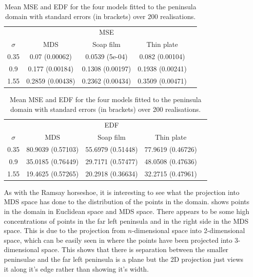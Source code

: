 \begin{table}[ht]
\centering
\begin{tabular}{c c c c c}
 &  & MSE  & &\\ 
$\sigma$ & MDS & Soap film & Thin plate\\ 
\hline
0.35  & 0.07 (0.00062) & 0.0539 (5e-04) &0.082 (0.00104)\\
0.9  & 0.177 (0.00184) & 0.1308 (0.00197) &0.1938 (0.00241)\\
1.55  & 0.2859 (0.00438) & 0.2362 (0.00434) &0.3509 (0.00471)\\
\end{tabular}
\begin{tabular}{c c c c c}
 &  & EDF  & &\\ 
$\sigma$ & MDS & Soap film & Thin plate\\ 
\hline
0.35 &80.9039 (0.57103) & 55.6979 (0.51448) & 77.9619 (0.46726)\\ 
0.9 &35.0185 (0.76449) & 29.7171 (0.57477) & 48.0508 (0.47636)\\ 
1.55 &19.4625 (0.57265) & 20.2918 (0.36634) & 32.2715 (0.47961)\\ 
\end{tabular}
\caption{Mean MSE and EDF for the four models fitted to the peninsula domain with standard errors (in brackets) over 200 realisations.}
\label{wt2resultstable}
\end{table}

As with the Ramsay horseshoe, it is interesting to see what the projection into MDS space has done to the distribution of the points in the domain.  shows points in the domain in Euclidean space and MDS space. There appears to be some high concentrations of points in the far left peninsula and in the right side in the MDS space. This is due to the projection from $n$-dimensional space into 2-dimensional space, which can be easily seen in  where the points have been projected into 3-dimensional space. This shows that there is separation between the smaller peninsulae and the far left peninsula is a plane but the 2D projection just views it along it's edge rather than showing it's width.

